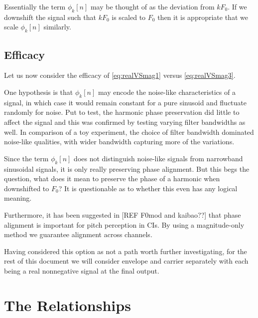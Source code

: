 \documentclass [11pt, proquest,oneside] {uwthesis}[2015/03/03]
\begin{document}
Essentially the term $\phi_k[n]$ may be thought of as the deviation from $kF_0$.  If we downshift the signal such that $kF_0$ is scaled to $F_0$ then it is appropriate that we scale $\phi_k[n]$ similarly.

\subsection{Efficacy}

Let us now consider the efficacy of \ref{eq:realVSmag1} versus  \ref{eq:realVSmag3}.

One hypothesis is that $\phi_k[n]$ may encode the noise-like characteristics of a signal, in which case it would remain constant for a pure sinusoid and fluctuate randomly for noise.  Put to test, the harmonic phase preservation did little to affect the signal and this was confirmed by testing varying filter bandwidths as well.  In comparison of a toy experiment, the choice of filter bandwidth dominated noise-like qualities, with wider bandwidth capturing more of the variations.

Since the term $\phi_k[n]$ does not distinguish noise-like signals from narrowband sinusoidal signals, it is only really preserving phase alignment.  But this begs the question, what does it mean to preserve the phase of a harmonic when downshifted to $F_0$?  It is questionable as to whether this even has any logical meaning.


Furthermore, it has been suggested in [REF F0mod and kaibao??] that phase alignment is important for pitch perception in CIs.  By using a magnitude-only method we guarantee alignment across channels.


Having considered this option as not a path worth further investigating, for the rest of this document we will consider envelope and carrier separately with each being a real nonnegative signal at the final output.

\section{The Relationships}
\end{document}
